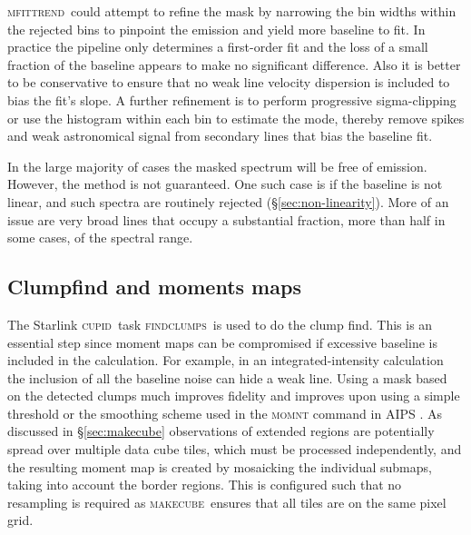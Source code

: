 \documentclass[useAMS,usenatbib]{mn2e}
\newcommand{\cupid}{\textsc{cupid}}
\newcommand{\makecube}{\textsc{makecube}}
\newcommand{\mfittrend}{\textsc{mfittrend}}
\newcommand{\findclumps}{\textsc{findclumps}}
\newcommand{\ascl}[1]{\href{http://www.ascl.net/#1}{ascl:#1}}
\begin{document}
\mfittrend\ could attempt to refine the mask by narrowing the bin
widths within the rejected bins to pinpoint the emission and yield
more baseline to fit.  In practice the pipeline only determines a
first-order fit and the loss of a small fraction of the baseline
appears to make no significant difference.  Also it is better to be
conservative to ensure that no weak line velocity dispersion is
included to bias the fit's slope.  A further refinement is to perform
progressive sigma-clipping or use the histogram within each bin to
estimate the mode, thereby remove spikes and weak astronomical signal
from secondary lines that bias the baseline fit.

In the large majority of cases the masked spectrum will be free of
emission.  However, the method is not guaranteed.  One such case is if
the baseline is not linear, and such spectra are routinely rejected
(\mbox{\S \ref{sec:non-linearity}}).  More of an issue are very broad
lines that occupy a substantial fraction, more than half in some
cases, of the spectral range.

\subsection{Clumpfind and moments maps \label{sec:moment}}

The Starlink \cupid\ task \findclumps\ is used to do the clump
find. This is an essential step since moment maps can be compromised
if excessive baseline is included in the calculation. For example, in an
integrated-intensity calculation the inclusion of all the baseline noise can
hide a weak line.
Using a mask based on the detected clumps much improves
fidelity and improves upon using a simple threshold or
the smoothing scheme used in the \textsc{momnt} command in AIPS
\cite[][\ascl{9911.003}]{2003ASSL..285..109G}. As discussed in
\mbox{\S \ref{sec:makecube}}
observations of extended regions are potentially spread over multiple
data cube tiles, which must be processed independently, and the resulting
moment map is created by
mosaicking the individual submaps, taking into account the border
regions. This is configured such that no resampling is required as
\makecube\ ensures that all tiles are on the same pixel grid.
\end{document}
